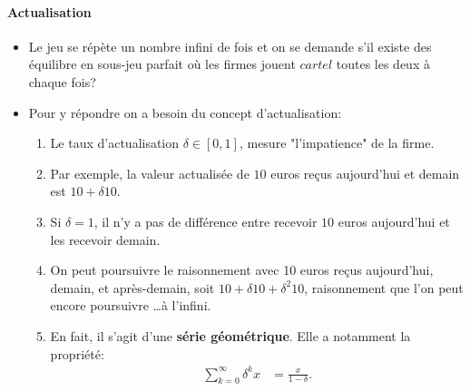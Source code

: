 \begin{frame}[allowframebreaks]{\insertsection}
\framesubtitle{Actualisation}
\begin{itemize}
    \item Le jeu se répète un nombre infini de fois et on se demande 
    s'il existe des équilibre en sous-jeu parfait où les firmes jouent $cartel$
     toutes les deux à chaque fois?
     \item Pour y répondre on a besoin du concept d'actualisation:
     \begin{enumerate}[-]
         \item Le taux d'actualisation $\delta \in [0, 1]$, mesure "l'impatience" de la firme.
         \item Par exemple, la valeur actualisée de  $10$ euros reçus aujourd'hui et demain 
         est $10 + \delta 10$.
         \item Si $\delta = 1$, il n'y a pas de différence entre recevoir $10$ euros aujourd'hui et les 
         recevoir demain.
         \item On peut poursuivre le raisonnement avec  10 euros reçus aujourd'hui, demain, et après-demain, soit
         $10 + \delta 10 + \delta^2 10$, raisonnement que l'on peut encore poursuivre \ldots à l'infini.
         \item En fait, il s'agit d'une \textbf{série géométrique}. Elle a notamment la propriété:
         \begin{align*}
             \sum_{k = 0}^\infty \delta^k x &= \frac{x}{1-\delta}.
         \end{align*}
     \end{enumerate}
\end{itemize}
\end{frame}

